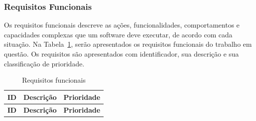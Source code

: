 \documentclass[12pt,a4paper]{article}
\begin{document}
\subsubsection{Requisitos Funcionais}
Os requisitos funcionais descreve as ações, funcionalidades, comportamentos e capacidades complexas que um software deve executar, de acordo com cada situação.
Na Tabela~\ref{tab:requisitos-funcionais}, serão apresentados os requisitos funcionais do trabalho em questão. Os requisitos são apresentados com identificador, sua descrição e sua classificação de prioridade.

\begin{longtable}{|p{}|p{}|p{}|}
\caption{Requisitos funcionais}
\label{tab:requisitos-funcionais} \\
\hline
\textbf{ID} & \textbf{Descrição} & \textbf{Prioridade} \\
\hline
\endfirsthead

\hline
\textbf{ID} & \textbf{Descrição} & \textbf{Prioridade} \\
\hline
\endhead


\end{longtable}
\end{document}
